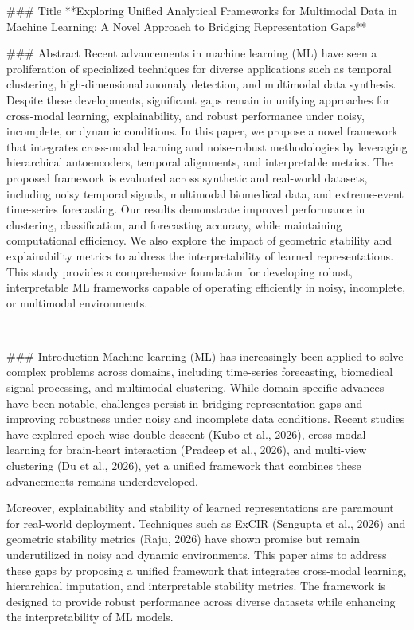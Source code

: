 ### Title
**Exploring Unified Analytical Frameworks for Multimodal Data in Machine Learning: A Novel Approach to Bridging Representation Gaps**

### Abstract
Recent advancements in machine learning (ML) have seen a proliferation of specialized techniques for diverse applications such as temporal clustering, high-dimensional anomaly detection, and multimodal data synthesis. Despite these developments, significant gaps remain in unifying approaches for cross-modal learning, explainability, and robust performance under noisy, incomplete, or dynamic conditions. In this paper, we propose a novel framework that integrates cross-modal learning and noise-robust methodologies by leveraging hierarchical autoencoders, temporal alignments, and interpretable metrics. The proposed framework is evaluated across synthetic and real-world datasets, including noisy temporal signals, multimodal biomedical data, and extreme-event time-series forecasting. Our results demonstrate improved performance in clustering, classification, and forecasting accuracy, while maintaining computational efficiency. We also explore the impact of geometric stability and explainability metrics to address the interpretability of learned representations. This study provides a comprehensive foundation for developing robust, interpretable ML frameworks capable of operating efficiently in noisy, incomplete, or multimodal environments.

---

### Introduction
Machine learning (ML) has increasingly been applied to solve complex problems across domains, including time-series forecasting, biomedical signal processing, and multimodal clustering. While domain-specific advances have been notable, challenges persist in bridging representation gaps and improving robustness under noisy and incomplete data conditions. Recent studies have explored epoch-wise double descent (Kubo et al., 2026), cross-modal learning for brain-heart interaction (Pradeep et al., 2026), and multi-view clustering (Du et al., 2026), yet a unified framework that combines these advancements remains underdeveloped. 

Moreover, explainability and stability of learned representations are paramount for real-world deployment. Techniques such as ExCIR (Sengupta et al., 2026) and geometric stability metrics (Raju, 2026) have shown promise but remain underutilized in noisy and dynamic environments. This paper aims to address these gaps by proposing a unified framework that integrates cross-modal learning, hierarchical imputation, and interpretable stability metrics. The framework is designed to provide robust performance across diverse datasets while enhancing the interpretability of ML models.

